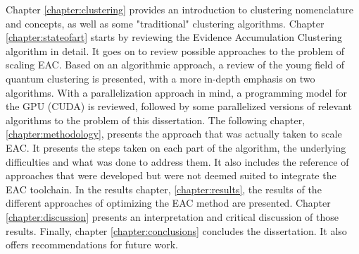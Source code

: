 Chapter \ref{chapter:clustering} provides an introduction to clustering nomenclature and concepts, as well as some "traditional" clustering algorithms.
Chapter \ref{chapter:stateofart} starts by reviewing the Evidence Accumulation Clustering algorithm in detail.
It goes on to review possible approaches to the problem of scaling EAC.
Based on an algorithmic approach, a review of the young field of quantum clustering is presented, with a more in-depth emphasis on two algorithms.
With a parallelization approach in mind, a programming model for the GPU (CUDA) is reviewed, followed by some parallelized versions of relevant algorithms to the problem of this dissertation.
The following chapter, \ref{chapter:methodology}, presents the approach that was actually taken to scale EAC.
It presents the steps taken on each part of the algorithm, the underlying difficulties and what was done to address them.
It also includes the reference of approaches that were developed but were not deemed suited to integrate the EAC toolchain.
In the results chapter, \ref{chapter:results}, the results of the different approaches of optimizing the EAC method are presented.
Chapter \ref{chapter:discussion} presents an interpretation and critical discussion of those results.
Finally, chapter \ref{chapter:conclusions} concludes the dissertation.
It also offers recommendations for future work.